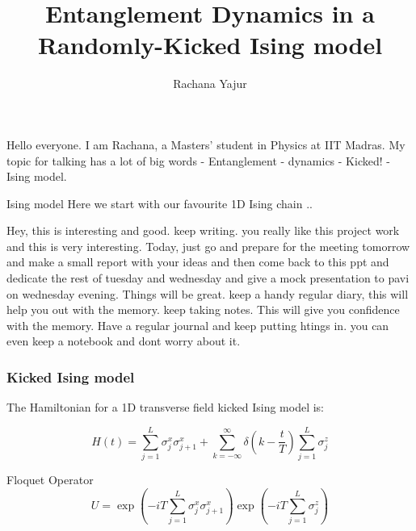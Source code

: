 \documentclass[11pt]{beamer}
\begin{document}
	
	
	

	


	\author{Rachana Yajur}
	\title{Entanglement Dynamics in a Randomly-Kicked Ising model}
	\date{}
	\subject{Mini Project Jan-May 2019}
	\begin{frame}[plain]
	Hello everyone. I am Rachana, a Masters' student in Physics at IIT Madras. My topic for talking has a lot of big words - Entanglement - dynamics - Kicked! - Ising model. 
	\end{frame}

    \begin{frame}{Ising model}
        Here we start with our favourite 1D Ising chain ..
        
        Hey, this is interesting and good. keep writing. you really like this project work and this is very interesting. Today, just go and prepare for the meeting tomorrow and make a small report with your ideas and then come back to this ppt and dedicate the rest of tuesday and wednesday and give a mock presentation to pavi on wednesday evening. Things will be great. keep a handy regular diary, this will help you out with the memory. keep taking notes. This will give you confidence with the memory. Have a regular journal and keep putting htings in. you can even keep a notebook and dont worry about it. 
    \end{frame}

\begin{frame}
\frametitle{Kicked Ising model}
The Hamiltonian for a 1D transverse field kicked Ising model is: 

\begin{equation}\label{key}
H(t)= \sum_{j=1}^{L}\sigma_{j}^{x} \sigma_{j+1}^{x} + \sum_{k=-\infty}^{\infty}\delta(k-\dfrac{t}{T})\sum_{j=1}^{L}\sigma_{j}^{z}
\end{equation}
\end{frame}


\begin{frame}{Floquet Operator}
\begin{equation}
U = \exp(-iT\sum_{j=1}^{L}\sigma_{j}^{x} \sigma_{j+1}^{x})  \exp(-iT\sum_{j=1}^{L}\sigma_{j}^{z})
\end{equation}
\end{frame}
\end{document}

